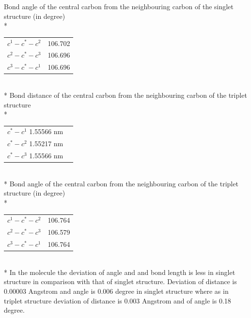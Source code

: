 \documentclass{article}
\begin{document}
Bond angle of the central carbon from the neighbouring carbon of the singlet structure (in degree)\\*
\begin{tabular}{c c}
\(c^{1}-c^{*}-c^{2}\) & 106.702\\
\(c^{2}-c^{*}-c^{3}\) & 106.696\\
\(c^{3}-c^{*}-c^{1}\) & 106.696\\
\end{tabular}\\*
Bond distance of the central carbon from the neighbouring carbon of the triplet structure\\*
\begin{tabular}{c c}
\(c^{*}-c^{1}\) 1.55566 nm\\
\(c^{*}-c^{2}\) 1.55217 nm\\
\(c^{*}-c^{3}\) 1.55566 nm\\
\end{tabular}\\*
Bond angle of the central carbon from the neighbouring carbon of the triplet structure (in degree)\\*
\begin{tabular}{c c}
\(c^{1}-c^{*}-c^{2}\) & 106.764 \\
\(c^{2}-c^{*}-c^{3}\) & 106.579\\
\(c^{3}-c^{*}-c^{1}\) & 106.764 \\
\end{tabular}\\*
In the molecule the deviation of angle and and bond length is less in singlet structure in comparison with that of singlet structure.
Deviation of distance is 0.00003 Angstrom and angle is 0.006 degree in singlet structure where as in triplet structure deviation of distance is 0.003 Angstrom and of angle is 0.18 degree.

\pagebreak
\end{document}
